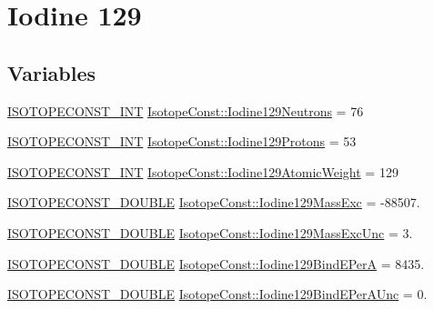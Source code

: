 \hypertarget{group___isotope_const-_iodine-_i129}{}\section{Iodine 129}
\label{group___isotope_const-_iodine-_i129}
\subsection*{Variables}
\begin{DoxyCompactItemize}
\item 
\mbox{\hyperlink{group___isotope_const-_macros_ga5f18360b3e99483a35c32d789e62621c}{I\+S\+O\+T\+O\+P\+E\+C\+O\+N\+S\+T\+\_\+\+I\+NT}} \mbox{\hyperlink{group___isotope_const-_iodine-_i129_gae3226b9ea800300cf5e9921fc1fbc75a}{Isotope\+Const\+::\+Iodine129\+Neutrons}} = 76
\item 
\mbox{\hyperlink{group___isotope_const-_macros_ga5f18360b3e99483a35c32d789e62621c}{I\+S\+O\+T\+O\+P\+E\+C\+O\+N\+S\+T\+\_\+\+I\+NT}} \mbox{\hyperlink{group___isotope_const-_iodine-_i129_gaa2cd5d3c1be6f17ebe525b6e3d7cfd75}{Isotope\+Const\+::\+Iodine129\+Protons}} = 53
\item 
\mbox{\hyperlink{group___isotope_const-_macros_ga5f18360b3e99483a35c32d789e62621c}{I\+S\+O\+T\+O\+P\+E\+C\+O\+N\+S\+T\+\_\+\+I\+NT}} \mbox{\hyperlink{group___isotope_const-_iodine-_i129_ga3adc40808e6799f66e0bf9b3997d97a5}{Isotope\+Const\+::\+Iodine129\+Atomic\+Weight}} = 129
\item 
\mbox{\hyperlink{group___isotope_const-_macros_ga8f45a7272ce02c0b4c65c44636ed719a}{I\+S\+O\+T\+O\+P\+E\+C\+O\+N\+S\+T\+\_\+\+D\+O\+U\+B\+LE}} \mbox{\hyperlink{group___isotope_const-_iodine-_i129_ga5403138f7df46b47ff8f677d275c410c}{Isotope\+Const\+::\+Iodine129\+Mass\+Exc}} = -\/88507.
\item 
\mbox{\hyperlink{group___isotope_const-_macros_ga8f45a7272ce02c0b4c65c44636ed719a}{I\+S\+O\+T\+O\+P\+E\+C\+O\+N\+S\+T\+\_\+\+D\+O\+U\+B\+LE}} \mbox{\hyperlink{group___isotope_const-_iodine-_i129_gab1554d746b9462ee1868dca2115d5696}{Isotope\+Const\+::\+Iodine129\+Mass\+Exc\+Unc}} = 3.
\item 
\mbox{\hyperlink{group___isotope_const-_macros_ga8f45a7272ce02c0b4c65c44636ed719a}{I\+S\+O\+T\+O\+P\+E\+C\+O\+N\+S\+T\+\_\+\+D\+O\+U\+B\+LE}} \mbox{\hyperlink{group___isotope_const-_iodine-_i129_ga074a3315e80c9606736c0dd9251442d4}{Isotope\+Const\+::\+Iodine129\+Bind\+E\+PerA}} = 8435.
\item 
\mbox{\hyperlink{group___isotope_const-_macros_ga8f45a7272ce02c0b4c65c44636ed719a}{I\+S\+O\+T\+O\+P\+E\+C\+O\+N\+S\+T\+\_\+\+D\+O\+U\+B\+LE}} \mbox{\hyperlink{group___isotope_const-_iodine-_i129_ga5dbf99ca3639559a59b8407a1c9ba891}{Isotope\+Const\+::\+Iodine129\+Bind\+E\+Per\+A\+Unc}} = 0.

\end{DoxyCompactItemize}
